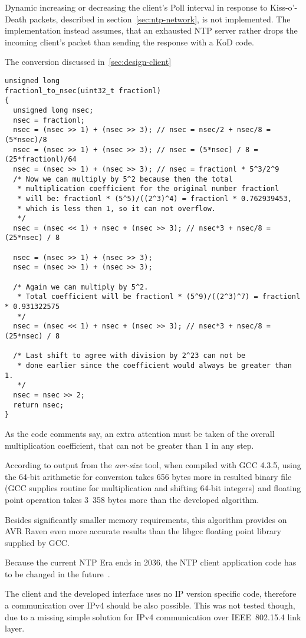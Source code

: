 Dynamic increasing or decreasing the client's Poll interval in response to
Kiss-o'-Death packets, described in section~\ref{sec:ntp-network}, is not implemented.
The implementation instead assumes, that an exhausted NTP server rather drops the incoming
client's packet than sending the response with a KoD code.


The conversion discussed in~\ref{sec:design-client}
\begin{lstlisting}[caption=Conversion from NTP fraction part to nanoseconds]
unsigned long
fractionl_to_nsec(uint32_t fractionl)
{
  unsigned long nsec;
  nsec = fractionl;
  nsec = (nsec >> 1) + (nsec >> 3); // nsec = nsec/2 + nsec/8 = (5*nsec)/8
  nsec = (nsec >> 1) + (nsec >> 3); // nsec = (5*nsec) / 8 = (25*fractionl)/64
  nsec = (nsec >> 1) + (nsec >> 3); // nsec = fractionl * 5^3/2^9
  /* Now we can multiply by 5^2 because then the total
   * multiplication coefficient for the original number fractionl
   * will be: fractionl * (5^5)/((2^3)^4) = fractionl * 0.762939453,
   * which is less then 1, so it can not overflow.
   */
  nsec = (nsec << 1) + nsec + (nsec >> 3); // nsec*3 + nsec/8 = (25*nsec) / 8

  nsec = (nsec >> 1) + (nsec >> 3);
  nsec = (nsec >> 1) + (nsec >> 3);

  /* Again we can multiply by 5^2.
   * Total coefficient will be fractionl * (5^9)/((2^3)^7) = fractionl * 0.931322575
   */
  nsec = (nsec << 1) + nsec + (nsec >> 3); // nsec*3 + nsec/8 = (25*nsec) / 8

  /* Last shift to agree with division by 2^23 can not be
   * done earlier since the coefficient would always be greater than 1.
   */
  nsec = nsec >> 2;
  return nsec;
}
\end{lstlisting}
As the code comments say, an extra attention must be taken of the overall
multiplication coefficient,
that can not be greater than 1 in any step.

According to output from the {\it{avr-size}} tool,
when compiled with GCC 4.3.5,
using the 64-bit arithmetic for conversion
takes 656 bytes more in %
resulted binary file (GCC supplies routine for multiplication and shifting 64-bit integers)
and floating point operation takes 3~358 bytes more
than the developed algorithm.


Besides significantly smaller memory requirements,
this algorithm provides on AVR Raven even more accurate results than the libgcc
floating point library supplied by GCC.


Because the current NTP Era ends in 2036,
the NTP client application code has to be changed in the future~\cite{ntp-y2k}.

The client and the developed interface uses no IP version specific code,
therefore a communication over IPv4 should be also possible.
This was not tested though, due to a missing simple solution for
IPv4 communication over IEEE~802.15.4 link layer.
